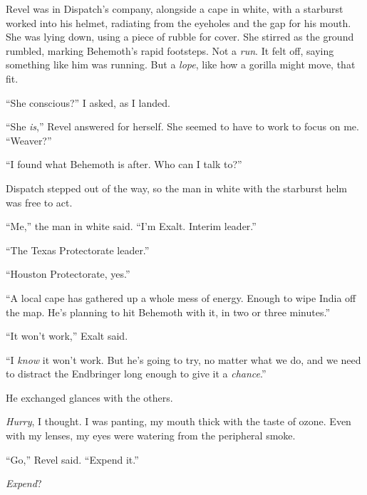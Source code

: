 Revel was in Dispatch's company, alongside a cape in white, with a starburst worked into his helmet, radiating from the eyeholes and the gap for his mouth.  She was lying down, using a piece of rubble for cover.  She stirred as the ground rumbled, marking Behemoth's rapid footsteps.  Not a \emph{run}.  It felt off, saying something like him was running.  But a \emph{lope}, like how a gorilla might move, that fit.



``She conscious?''  I asked, as I landed.



``She \emph{is},'' Revel answered for herself.  She seemed to have to work to focus on me.  ``Weaver?''



``I found what Behemoth is after.  Who can I talk to?''



Dispatch stepped out of the way, so the man in white with the starburst helm was free to act.



``Me,'' the man in white said.  ``I'm Exalt.  Interim leader.''



``The Texas Protectorate leader.''



``Houston Protectorate, yes.''



``A local cape has gathered up a whole mess of energy.  Enough to wipe India off the map.  He's planning to hit Behemoth with it, in two or three minutes.''



``It won't work,'' Exalt said.



``I \emph{know} it won't work.  But he's going to try, no matter what we do, and we need to distract the Endbringer long enough to give it a \emph{chance}.''



He exchanged glances with the others.



\emph{Hurry}, I thought.  I was panting, my mouth thick with the taste of ozone.  Even with my lenses, my eyes were watering from the peripheral smoke.



``Go,'' Revel said.  ``Expend it.''



\emph{Expend}?



